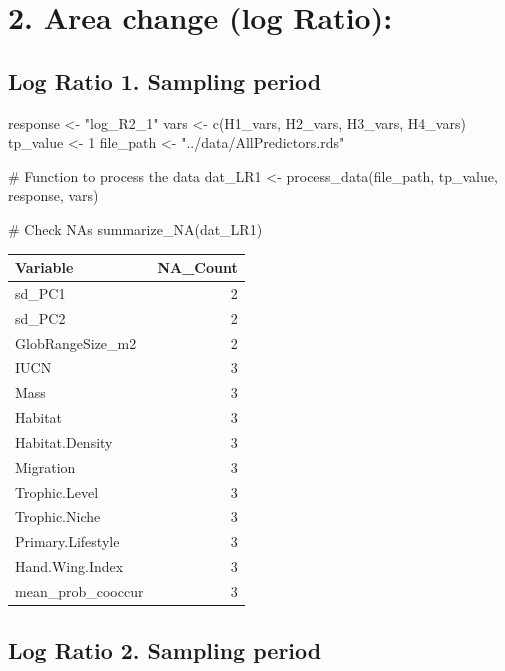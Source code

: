 \documentclass[
  letterpaper,
  DIV=11,
  numbers=noendperiod]{scrreprt}
\newenvironment{Shaded}{\begin{snugshade}}{\end{snugshade}}
\newcommand{\CommentTok}[1]{\textcolor[rgb]{0.37,0.37,0.37}{#1}}
\newcommand{\DecValTok}[1]{\textcolor[rgb]{0.68,0.00,0.00}{#1}}
\newcommand{\FunctionTok}[1]{\textcolor[rgb]{0.28,0.35,0.67}{#1}}
\newcommand{\NormalTok}[1]{\textcolor[rgb]{0.00,0.23,0.31}{#1}}
\newcommand{\OtherTok}[1]{\textcolor[rgb]{0.00,0.23,0.31}{#1}}
\newcommand{\StringTok}[1]{\textcolor[rgb]{0.13,0.47,0.30}{#1}}
\begin{document}
\section{2. Area change (log Ratio):}\label{area-change-log-ratio}

\subsection{Log Ratio 1. Sampling period}

\begin{Shaded}
\begin{Highlighting}[]
\NormalTok{response }\OtherTok{\textless{}{-}} \StringTok{"log\_R2\_1"}
\NormalTok{vars }\OtherTok{\textless{}{-}} \FunctionTok{c}\NormalTok{(H1\_vars, H2\_vars, H3\_vars, H4\_vars)}
\NormalTok{tp\_value }\OtherTok{\textless{}{-}} \DecValTok{1}
\NormalTok{file\_path }\OtherTok{\textless{}{-}} \StringTok{"../data/AllPredictors.rds"}

\CommentTok{\# Function to process the data}
\NormalTok{dat\_LR1 }\OtherTok{\textless{}{-}} \FunctionTok{process\_data}\NormalTok{(file\_path, tp\_value, response, vars)}

\CommentTok{\# Check NAs}
\FunctionTok{summarize\_NA}\NormalTok{(dat\_LR1)}
\end{Highlighting}
\end{Shaded}

\begin{longtable}[]{@{}lr@{}}
\toprule\noalign{}
Variable & NA\_Count \\
\midrule\noalign{}
\endhead
\bottomrule\noalign{}
\endlastfoot
sd\_PC1 & 2 \\
sd\_PC2 & 2 \\
GlobRangeSize\_m2 & 2 \\
IUCN & 3 \\
Mass & 3 \\
Habitat & 3 \\
Habitat.Density & 3 \\
Migration & 3 \\
Trophic.Level & 3 \\
Trophic.Niche & 3 \\
Primary.Lifestyle & 3 \\
Hand.Wing.Index & 3 \\
mean\_prob\_cooccur & 3 \\
\end{longtable}

\subsection{Log Ratio 2. Sampling period}
\end{document}
